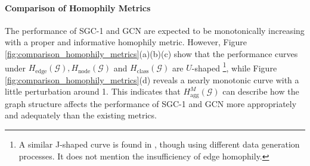 \documentclass{article}
\newcommand{\0}{{\boldsymbol{0}}}
\newcommand{\6}{{\partial}}
\newcommand{\8}{{\infty}}
\newcommand{\4}{{\nabla}}
\begin{document}
\paragraph{Comparison of Homophily Metrics}
The performance of SGC-1 and GCN are expected to be monotonically increasing with a proper and informative homophily metric. However, Figure \ref{fig:comparison_homophily_metrics}(a)(b)(c) show that the performance curves under $H_{\text{edge}}(\mathcal{G}), H_{\text{node}}(\mathcal{G})$ and $H_{\text{class}}(\mathcal{G})$ are $U$-shaped \footnote{A similar J-shaped curve is found in \cite{zhu2020beyond}, though using different data generation processes. It does not mention the insufficiency of edge homophily.}, while Figure \ref{fig:comparison_homophily_metrics}(d) reveals a nearly monotonic curve with a little perturbation around 1. This indicates that $H_{\text{agg}}^M(\mathcal{G})$ can describe how the graph structure affects the performance of SGC-1 and GCN more appropriately and adequately than the existing metrics.
\end{document}
